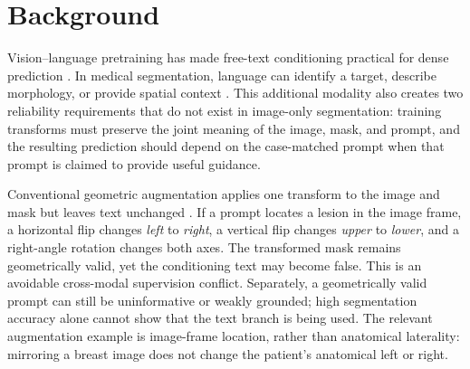 
\section{Background}
\label{sec:intro}
Vision--language pretraining has made free-text conditioning practical for dense
prediction \cite{radford2021clip,clipseg,biomedclip}. In medical segmentation,
language can identify a target, describe morphology, or provide spatial context
\cite{lvit,causalclipseg,medclipseg}. This additional modality also creates two
reliability requirements that do not exist in image-only segmentation: training
transforms must preserve the joint meaning of the image, mask, and prompt, and
the resulting prediction should depend on the case-matched prompt when that
prompt is claimed to provide useful guidance.

Conventional geometric augmentation applies one transform to the image and mask
but leaves text unchanged \cite{shorten2019survey}. If a prompt locates a lesion
in the image frame, a horizontal flip changes \textit{left} to \textit{right},
a vertical flip changes \textit{upper} to \textit{lower}, and a right-angle
rotation changes both axes. The transformed mask remains geometrically valid,
yet the conditioning text may become false. This is an avoidable cross-modal
supervision conflict. Separately, a geometrically valid prompt can still be
uninformative or weakly grounded; high segmentation accuracy alone cannot show
that the text branch is being used. The relevant augmentation example is
image-frame location, rather than
anatomical laterality: mirroring a breast image does not change the patient's
anatomical left or right.

